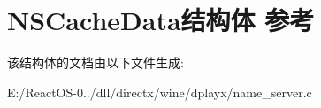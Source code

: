 \hypertarget{struct_n_s_cache_data}{}\section{N\+S\+Cache\+Data结构体 参考}
\label{struct_n_s_cache_data}


该结构体的文档由以下文件生成\+:\begin{DoxyCompactItemize}
\item 
E\+:/\+React\+O\+S-\/0../dll/directx/wine/dplayx/name\+\_\+server.\+c\end{DoxyCompactItemize}
